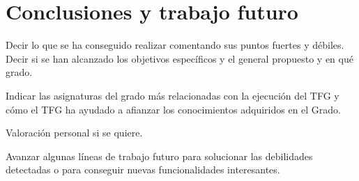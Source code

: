 \documentclass[a4paper,11pt]{book}
\begin{document}






\chapter{Conclusiones y trabajo futuro}

Decir lo que se ha conseguido realizar comentando sus puntos fuertes y débiles.
Decir si se han alcanzado los objetivos específicos y el general propuesto y en qué grado.

Indicar las asignaturas del grado más relacionadas con la ejecución del TFG y cómo el TFG ha ayudado a afianzar los conocimientos adquiridos en el Grado.

Valoración personal si se quiere.


Avanzar algunas líneas de trabajo futuro para solucionar las debilidades detectadas o para conseguir nuevas funcionalidades interesantes.
\end{document}
